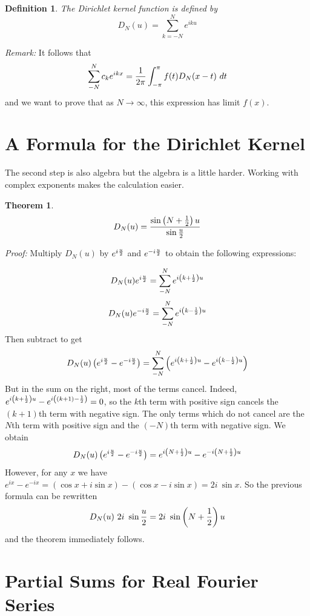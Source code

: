 \documentclass[11pt, oneside]{article}   	%
\newtheorem{theorem}{Theorem}
\newtheorem{definition}{Definition}
\begin{document}
\begin{definition}
The Dirichlet kernel function is defined by
\[D_N(u) = \sum_{k = -N}^N e^{iku}\]
\end{definition}

{\em Remark:} It follows that 
\[\sum_{-N}^N c_k e^{ikx} = {1 \over {2 \pi}} \int_{- \pi}^\pi f(t) D_N(x - t) \ dt\]
and we want to prove that as $N \rightarrow \infty$, this expression has limit $f(x)$.

\section{A Formula for the Dirichlet Kernel}

The second step is also algebra but the algebra is a little harder. Working with complex exponents makes the calculation easier.
\begin{theorem}
\[D_N(u) = {{\sin \left(N + {1 \over 2} \right)u } \over {\sin {u \over 2}}}\]
\end{theorem}
{\em Proof:} %
Multiply $D_N(u)$ by $e^{i {u \over 2}}$ and $e^{-i {u \over 2}}$ to obtain the following expressions:

\[D_N(u) e^{i {u \over 2}} = \sum_{-N}^N e^{i \left(k + {1 \over 2}\right)u}\]
\[D_N(u) e^{- i {u \over 2}} = \sum_{-N}^N e^{i \left(k - {1 \over 2}\right)u}\]
Then subtract to get
\[D_N(u) \left(e^{i {u \over 2}} - e^{- i {u \over 2}} \right) = \sum_{-N}^N\left( e^{i \left(k + {1 \over 2}\right)u} - e^{i \left(k - {1 \over 2}\right)u} \right) \]
But in the sum on the right, most of the terms cancel. Indeed, $e^{i \left(k + {1 \over 2}\right)u} - e^{i \left( (k + 1) - {1 \over 2} \right)} = 0$, so the $k$th term with positive sign cancels the $(k + 1)$th term with negative sign.
The only terms which do not cancel are the $N$th term with positive sign and the $(-N)$th term with negative sign. We obtain
\[D_N(u) \left(e^{i {u \over 2}} - e^{- i {u \over 2}} \right) = e^{i \left( N + {1 \over 2} \right)u} - e^{- i \left( N + {1 \over 2} \right) u}\]
However, for any $x$ we have $e^{ix} - e^{-ix} = \left( \cos x + i \sin x \right) - \left( \cos x - i \sin x \right) = 2 i \ \sin x.$ So the previous formula can be rewritten
\[D_N(u) \ 2i \ \sin {u \over 2} = 2 i \ \sin \left(N + {1 \over 2} \right) u\]
and the theorem immediately follows.

\section{Partial Sums for Real Fourier Series}
\end{document}
